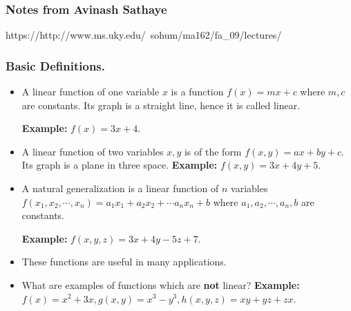  \begin{frame}[fragile] \frametitle{Notes from Avinash Sathaye}
https://http://www.ms.uky.edu/~sohum/ma162/fa\_09/lectures/
\end{frame}

\begin{frame}

  \frametitle{Basic Definitions.} 
  \begin{itemize}%
  \item 
    A linear function of one variable $x$ is a function $f(x)=mx+c$ where $m,c$ are constants.
    Its graph is a straight line, hence it is called linear.
    
    {\bf Example:} $\displaystyle f(x) = 3x+4$.
   
  \item A linear function of two variables $x,y$ is of the form $f(x,y)=ax+by+c$. Its graph is a plane in three space.
  {\bf Example:} $\displaystyle f(x,y) = 3x+4y+5$.

  \item 
    A natural generalization is a linear function of $n$ variables 
    $\displaystyle f(x_1,x_2,\cdots ,x_n)= a_1x_1+a_2x_2+\cdots a_nx_n+b$
    where $a_1,a_2,\cdots , a_n,b$ are constants.
    
  {\bf Example:} $\displaystyle f(x,y,z) = 3x+4y-5z+7$.  
  \item 
   These functions are useful in many applications.
   
   \item 
   What are examples of functions which are {\bf not} linear?
    {\bf Example:} $\displaystyle f(x)=x^2+3x, g(x,y)=x^3-y^3, h(x,y,z)=xy+yz+zx $.
  \end{itemize}
\end{frame}

